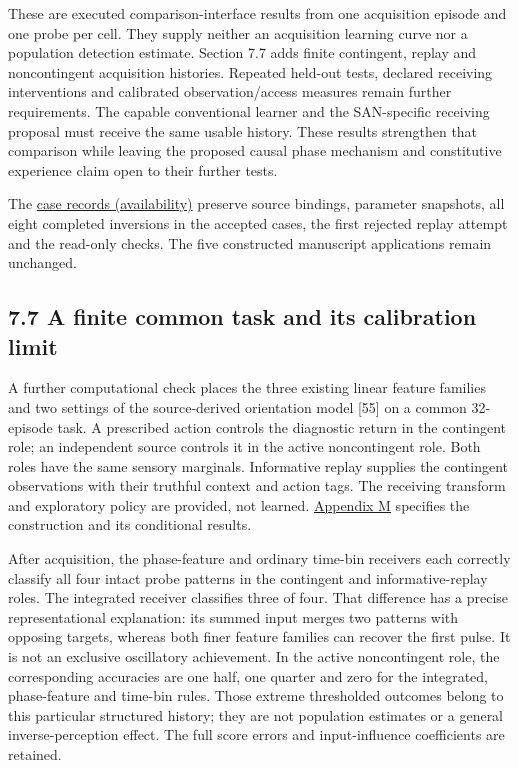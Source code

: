 \documentclass[
  american,
  11pt,
  letterpaper,
]{article}
\begin{document}
These are executed comparison-interface results from one acquisition episode and one probe per cell. They supply neither an acquisition learning curve nor a population detection estimate. Section 7.7 adds finite contingent, replay and noncontingent acquisition histories. Repeated held-out tests, declared receiving interventions and calibrated observation/access measures remain further requirements. The capable conventional learner and the SAN-specific receiving proposal must receive the same usable history. These results strengthen that comparison while leaving the proposed causal phase mechanism and constitutive experience claim open to their further tests.

The \href{https://github.com/v5ma/v5ma.github.io/blob/master/papers/companions/learning-to-feel-v1.0/ARTIFACT-AVAILABILITY.md\#artifact-40}{case records (availability)} preserve source bindings, parameter snapshots, all eight completed inversions in the accepted cases, the first rejected replay attempt and the read-only checks. The five constructed manuscript applications remain unchanged.

\subsection{7.7 A finite common task and its calibration limit}\label{a-finite-common-task-and-its-calibration-limit}

A further computational check places the three existing linear feature families and two settings of the source-derived orientation model {[}55{]} on a common 32-episode task. A prescribed action controls the diagnostic return in the contingent role; an independent source controls it in the active noncontingent role. Both roles have the same sensory marginals. Informative replay supplies the contingent observations with their truthful context and action tags. The receiving transform and exploratory policy are provided, not learned. \href{https://zenodo.org/records/23509961/files/Learning-to-Feel-Technical-Supplement-v1.1.pdf\#appendix-m}{Appendix M} specifies the construction and its conditional results.

After acquisition, the phase-feature and ordinary time-bin receivers each correctly classify all four intact probe patterns in the contingent and informative-replay roles. The integrated receiver classifies three of four. That difference has a precise representational explanation: its summed input merges two patterns with opposing targets, whereas both finer feature families can recover the first pulse. It is not an exclusive oscillatory achievement. In the active noncontingent role, the corresponding accuracies are one half, one quarter and zero for the integrated, phase-feature and time-bin rules. Those extreme thresholded outcomes belong to this particular structured history; they are not population estimates or a general inverse-perception effect. The full score errors and input-influence coefficients are retained.
\end{document}
